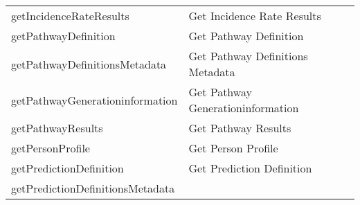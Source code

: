 \documentclass[
]{article}
\begin{document}
\begin{longtable}[]{@{}ll@{}}
\begin{minipage}[t]{0.46\columnwidth}
getIncidenceRateResults\strut
\end{minipage} & \begin{minipage}[t]{0.48\columnwidth}\raggedright
Get Incidence Rate Results\strut
\end{minipage}\tabularnewline
\begin{minipage}[t]{0.46\columnwidth}\raggedright
getPathwayDefinition\strut
\end{minipage} & \begin{minipage}[t]{0.48\columnwidth}\raggedright
Get Pathway Definition\strut
\end{minipage}\tabularnewline
\begin{minipage}[t]{0.46\columnwidth}\raggedright
getPathwayDefinitionsMetadata\strut
\end{minipage} & \begin{minipage}[t]{0.48\columnwidth}\raggedright
Get Pathway Definitions Metadata\strut
\end{minipage}\tabularnewline
\begin{minipage}[t]{0.46\columnwidth}\raggedright
getPathwayGenerationinformation\strut
\end{minipage} & \begin{minipage}[t]{0.48\columnwidth}\raggedright
Get Pathway Generationinformation\strut
\end{minipage}\tabularnewline
\begin{minipage}[t]{0.46\columnwidth}\raggedright
getPathwayResults\strut
\end{minipage} & \begin{minipage}[t]{0.48\columnwidth}\raggedright
Get Pathway Results\strut
\end{minipage}\tabularnewline
\begin{minipage}[t]{0.46\columnwidth}\raggedright
getPersonProfile\strut
\end{minipage} & \begin{minipage}[t]{0.48\columnwidth}\raggedright
Get Person Profile\strut
\end{minipage}\tabularnewline
\begin{minipage}[t]{0.46\columnwidth}\raggedright
getPredictionDefinition\strut
\end{minipage} & \begin{minipage}[t]{0.48\columnwidth}\raggedright
Get Prediction Definition\strut
\end{minipage}\tabularnewline
\begin{minipage}[t]{0.46\columnwidth}\raggedright
getPredictionDefinitionsMetadata\strut

\end{minipage}
\end{longtable}
\end{document}
